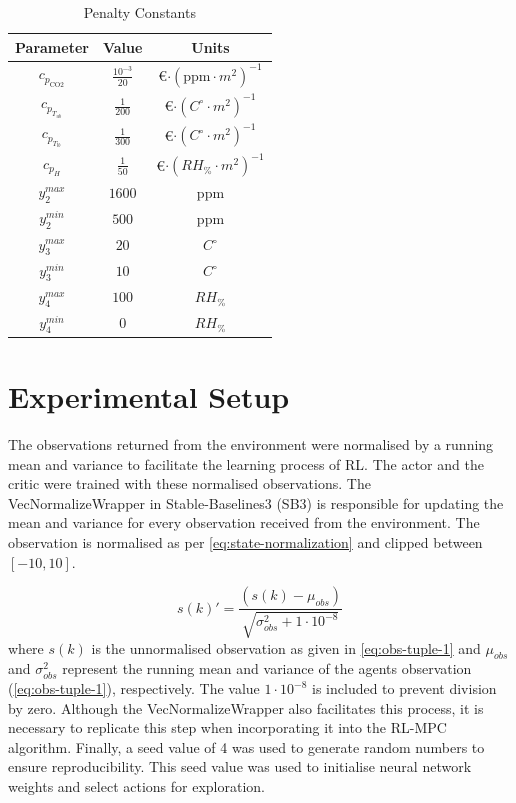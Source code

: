 \begin{table}[h]
	\centering
	\begin{tabular}{|c|c|c|}
		\hline
		\textbf{Parameter} & \textbf{Value} & \textbf{Units} \\
		\hline
		$c_{p_{\text{CO2}}}$ & $\frac{10^{-3}}{20}$ & \euro$\cdot (\text{ppm} \cdot m^2)^{-1}$ \\
		$c_{p_{T_{ub}}}$ & $\frac{1}{200}$ & \euro$\cdot (C^{\circ} \cdot m^2)^{-1}$ \\
		$c_{p_{T_{lb}}}$ & $\frac{1}{300}$ & \euro$\cdot (C^{\circ} \cdot m^2)^{-1}$ \\
		$c_{p_{H}}$ & $\frac{1}{50}$ & \euro$\cdot (RH_{\%} \cdot m^2)^{-1}$ \\
		$y_2^{max}$ & $1600$ & ppm \\
		$y_2^{min}$ & $500$ & ppm \\
		$y_3^{max}$ & $20$ & $C^{\circ}$ \\
		$y_3^{min}$ & $10$ & $C^{\circ}$ \\
		$y_4^{max}$ & $100$ & $RH_{\%}$ \\
		$y_4^{min}$ & $0$ & $RH_{\%}$ \\       
		\hline
	\end{tabular}
	\caption{Penalty Constants}
	\label{tab:pen-constants}
\end{table}




\section{Experimental Setup} \label{section:experimental-setup}
The observations returned from the environment were normalised by a running mean and variance to facilitate the learning process of RL. The actor and the critic were trained with these normalised observations. The VecNormalizeWrapper in Stable-Baselines3 (SB3) \cite{raffinStableBaselines3ReliableReinforcement2021} is responsible for updating the mean and variance for every observation received from the environment. The observation is normalised as per \autoref{eq:state-normalization} and clipped between $[-10,10]$.

\begin{equation}\label{eq:state-normalization}
    s(k)' = \frac{(s(k) - \mu_{obs}) }{\sqrt{\sigma^2_{obs} + 1\cdot 10^{-8}}}
\end{equation}
where $s(k)$ is the unnormalised observation as given in \autoref{eq:obs-tuple-1} and $\mu_{obs}$ and $\sigma^2_{obs}$ represent the running mean and variance of the agents observation (\autoref{eq:obs-tuple-1}), respectively.  The value $1\cdot 10^{-8}$ is included to prevent division by zero. Although the VecNormalizeWrapper also facilitates this process, it is necessary to replicate this step when incorporating it into the RL-MPC algorithm. Finally, a seed value of 4 was used to generate random numbers to ensure reproducibility. This seed value was used to initialise neural network weights and select actions for exploration.

